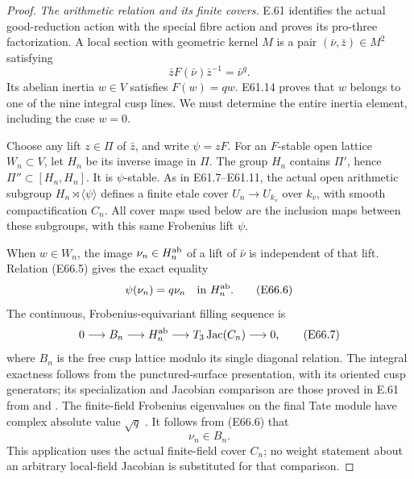 \begin{proof}
\emph{The arithmetic relation and its finite covers.}
E.61 identifies the actual good-reduction action with the special
fibre action and proves its pro-three factorization. A local
section with geometric kernel $M$ is a pair
$(\bar\nu,\bar z)\in M^2$ satisfying
\[
        \bar zF(\bar\nu)\bar z^{-1}=\bar\nu^q.
 \tag{E66.5}
\]
Its abelian inertia $w\in V$ satisfies $F(w)=qw$.
E61.14 proves that $w$ belongs to one of the nine integral
cusp lines. We must determine the entire inertia element,
including the case $w=0$.

Choose any lift $z\in\Pi$ of $\bar z$, and write $\psi=zF$.
For an $F$-stable open lattice $W_n\subset V$, let
$H_n$ be its inverse image in $\Pi$. The group $H_n$ contains
$\Pi'$, hence $\Pi''\subset[H_n,H_n]$. It is $\psi$-stable.
As in E61.7--E61.11, the actual open arithmetic subgroup
$H_n\rtimes\langle\psi\rangle$ defines a finite etale cover
$U_n\to U_{k_v}$ over $k_v$, with smooth compactification $C_n$.
All cover maps used below are the inclusion maps between these
subgroups, with this same Frobenius lift $\psi$.

When $w\in W_n$, the image $\nu_n\in H_n^{\rm ab}$ of a lift
of $\bar\nu$ is independent of that lift. Relation (E66.5)
gives the exact equality
\[
                  \psi(\nu_n)=q\nu_n
                    \quad\hbox{in }H_n^{\rm ab}.
 \tag{E66.6}
\]
The continuous, Frobenius-equivariant filling sequence is
\[
 0\longrightarrow B_n\longrightarrow H_n^{\rm ab}
       \longrightarrow T_3\operatorname{Jac}(C_n)
       \longrightarrow0,
 \tag{E66.7}
\]
where $B_n$ is the free cusp lattice modulo its single diagonal
relation. The integral exactness follows from the punctured-surface
presentation, with its oriented cusp generators; its specialization
and Jacobian comparison are those proved in E.61 from
\cite[XIII, 2.9--2.12]{E_SGA1} and
\cite[III, Proposition9.1]{E_MilneAV2008}.
The finite-field Frobenius eigenvalues on the final Tate module
have complex absolute value $\sqrt q$
\cite[II, Theorem1.1(b)]{E_MilneAV2008}.
It follows from (E66.6) that
\[
                         \nu_n\in B_n .
 \tag{E66.8}
\]
This application uses the actual finite-field cover $C_n$;
no weight statement about an arbitrary local-field Jacobian is
substituted for that comparison.


\end{proof}
